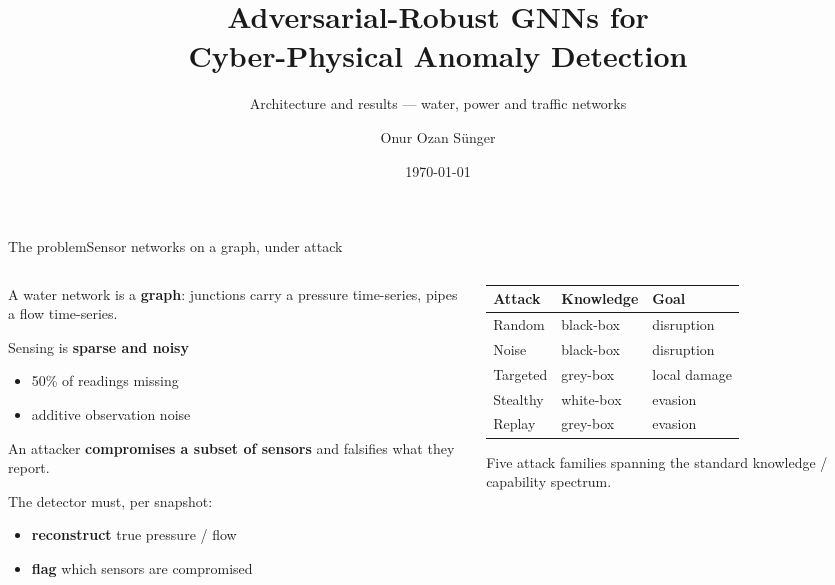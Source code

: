 \documentclass[aspectratio=169,11pt]{beamer}
\title{\textbf{Adversarial-Robust GNNs for\\Cyber-Physical Anomaly Detection}}
\subtitle{Architecture and results — water, power and traffic networks}
\author{Onur Ozan S\"unger}
\institute{MSc Thesis · Sapienza Universit\`a di Roma\\
\small Advisors: Tiziana Cattai, Pierluigi Locatelli}
\date{\today}
\newcommand{\hl}[1]{\textcolor{cBlue}{\textbf{#1}}}
\begin{document}
\begin{frame}[plain]
  \titlepage
\end{frame}

\begin{frame}{The problem}{Sensor networks on a graph, under attack}
  \begin{columns}[T,onlytextwidth]
    \begin{column}{0.54\textwidth}
      \small
      A water network is a \hl{graph}: junctions carry a pressure
      time-series, pipes a flow time-series.
      \medskip

      Sensing is \hl{sparse and noisy}
      \begin{itemize}\small
        \item 50\% of readings missing
        \item additive observation noise
      \end{itemize}
      \medskip

      An attacker \hl{compromises a subset of sensors} and falsifies what
      they report.
      \medskip

      The detector must, per snapshot:
      \begin{itemize}\small
        \item \textbf{reconstruct} true pressure / flow
        \item \textbf{flag} which sensors are compromised
      \end{itemize}
    \end{column}
    \begin{column}{0.46\textwidth}
      \centering
      \scriptsize
      \renewcommand{\arraystretch}{1.35}
      \begin{tabular}{@{}l l l@{}}
        \toprule
        \textbf{Attack} & \textbf{Knowledge} & \textbf{Goal}\\
        \midrule
        Random   & black-box & disruption\\
        Noise    & black-box & disruption\\
        Targeted & grey-box  & local damage\\
        Stealthy & white-box & evasion\\
        Replay   & grey-box  & evasion\\
        \bottomrule
      \end{tabular}
      \vspace{6pt}

      {\scriptsize\color{cMuted} Five attack families spanning the
       standard knowledge / capability spectrum.}
    \end{column}
  \end{columns}
\end{frame}
\end{document}
